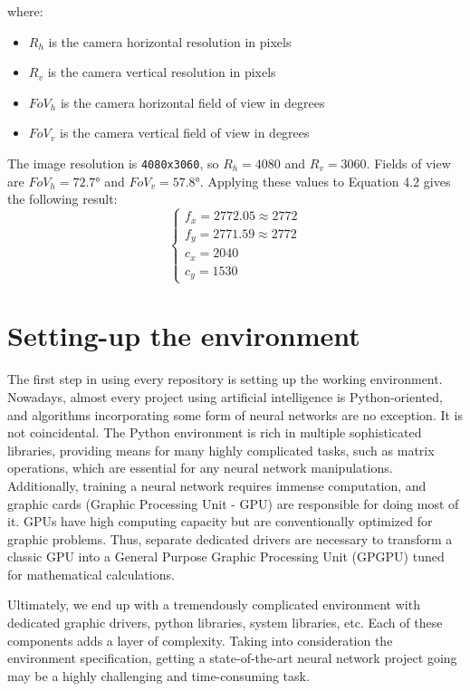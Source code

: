 where:
\begin{itemize}
  \item $R_h$ is the camera horizontal resolution in pixels
  \item $R_v$ is the camera vertical resolution in pixels
  \item $FoV_h$ is the camera horizontal field of view in degrees
  \item $FoV_v$ is the camera vertical field of view in degrees
\end{itemize}

The image resolution is \texttt{4080x3060}, so $R_h = 4080$ and $R_v = 3060$. 
Fields of view are $FoV_h = \ang{72.7}$ and $FoV_v = \ang{57.8}$.
Applying these values to Equation 4.2 gives the following result:
\begin{equation} \label{eq:camera-intrinsic-parameters-solved}
\begin{cases}
  f_x = 2772.05 \approx 2772 \\
  f_y = 2771.59 \approx 2772 \\
  c_x = 2040 \\
  c_y = 1530
\end{cases}
\end{equation}

\section{Setting-up the environment}

The first step in using every repository is setting up the working environment.
Nowadays, almost every project using artificial intelligence is Python-oriented,
and algorithms incorporating some form of neural networks are no exception.
It is not coincidental.
The Python environment is rich in multiple sophisticated libraries,
providing means for many highly complicated tasks, such as matrix operations,
which are essential for any neural network manipulations.
Additionally, training a neural network requires immense computation,
and graphic cards (Graphic Processing Unit - GPU) are responsible for doing most of it.
GPUs have high computing capacity but are conventionally optimized for graphic problems.
Thus, separate dedicated drivers are necessary to transform a classic GPU
into a General Purpose Graphic Processing Unit (GPGPU) tuned for mathematical calculations.

\par

Ultimately, we end up with a tremendously complicated environment
with dedicated graphic drivers, python libraries, system libraries, etc.
Each of these components adds a layer of complexity.
Taking into consideration the environment specification,
getting a state-of-the-art neural network project going may be a highly challenging and time-consuming task.

